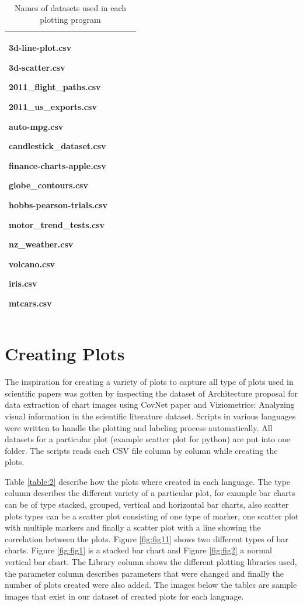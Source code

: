 \documentclass[12pt, a4paper,oneside]{report}
\begin{document}
\begin{table}[h]
\begin{tabular}{|p{5cm}|p{3cm}|p{3cm}|p{4cm}|}
		3d-line-plot.csv \par 3d-scatter.csv \par 2011\_flight\_paths.csv \par 2011\_us\_exports.csv \par auto-mpg.csv \par candlestick\_dataset.csv \par finance-charts-apple.csv \par 
		globe\_contours.csv\par hobbs-pearson-trials.csv \par motor\_trend\_tests.csv \par 
		nz\_weather.csv \par volcano.csv \par iris.csv \par mtcars.csv	\\ \hline
		
	\end{tabular}
	\caption {Names of datasets used in each plotting program}	
	\label{table:1}
\end{table}


\section{Creating Plots}
The inspiration for creating a variety of plots to capture all type of plots used in scientific papers was gotten by inspecting the dataset of Architecture proposal for data extraction of chart images using CovNet paper \cite{junior2017archi} and Viziometrics: Analyzing visual information in the scientific literature \cite{lee2018viziometrics} dataset. Scripts in various languages were written to handle the plotting and labeling process automatically. All datasets for a particular plot (example scatter plot for python) are put into one folder. The scripts reads each CSV file column by column while creating the plots.
 
Table \ref{table:2} describe how the plots where created in each language. The type column describes the different variety of a particular plot, for example bar charts can be of type stacked, grouped, vertical and horizontal bar charts, also scatter plots types can be a scatter plot consisting of one type of marker, one scatter plot with multiple markers and finally a scatter plot with a line showing the correlation between the plots. 
Figure \ref{fig:fig11} shows two different types of bar charts. Figure \ref{fig:fig1} is a stacked bar chart and  Figure \ref{fig:fig2} a normal vertical bar chart.
The Library column shows the different plotting libraries used, the parameter column describes parameters that were changed and finally the number of plots created were also added. The images below the tables are sample images that exist in our dataset of created plots for each language.
\end{document}
